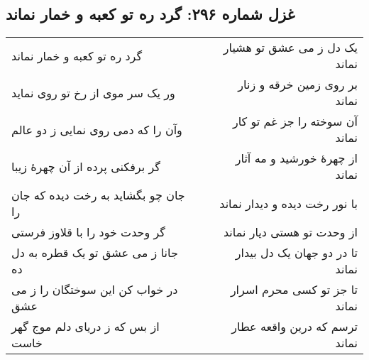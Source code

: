 \begin{center}
\section*{غزل شماره ۲۹۶: گرد ره تو کعبه و خمار نماند}
\label{sec:296}
\begin{longtable}{l p{0.5cm} r}
گرد ره تو کعبه و خمار نماند
&&
یک دل ز می عشق تو هشیار نماند
\\
ور یک سر موی از رخ تو روی نماید
&&
بر روی زمین خرقه و زنار نماند
\\
وآن را که دمی روی نمایی ز دو عالم
&&
آن سوخته را جز غم تو کار نماند
\\
گر برفکنی پرده از آن چهرهٔ زیبا
&&
از چهرهٔ خورشید و مه آثار نماند
\\
جان چو بگشاید به رخت دیده که جان را
&&
با نور رخت دیده و دیدار نماند
\\
گر وحدت خود را با قلاوز فرستی
&&
از وحدت تو هستی دیار نماند
\\
جانا ز می عشق تو یک قطره به دل ده
&&
تا در دو جهان یک دل بیدار نماند
\\
در خواب کن این سوختگان را ز می عشق
&&
تا جز تو کسی محرم اسرار نماند
\\
از بس که ز دریای دلم موج گهر خاست
&&
ترسم که درین واقعه عطار نماند
\\
\end{longtable}
\end{center}
